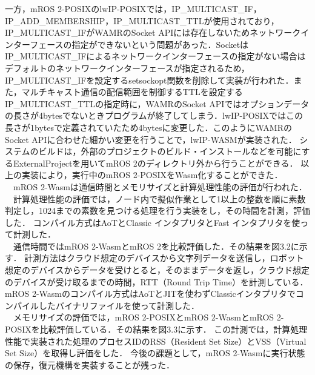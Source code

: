 一方，mROS 2-POSIXのlwIP-POSIXでは，IP\_MULTICAST\_IF，IP\_ADD\_MEMBERSHIP，IP\_MULTICAST\_TTLが使用されており，IP\_MULTICAST\_IFがWAMRのSocket APIには存在しないためネットワークインターフェースの指定ができないという問題があった．SocketはIP\_MULTICAST\_IFによるネットワークインターフェースの指定がない場合はデフォルトのネットワークインターフェースが指定されるため，IP\_MULTICAST\_IFを設定するsetsockopt関数を削除して実装が行われた．また，マルチキャスト通信の配信範囲を制御するTTLを設定するIP\_MULTICAST\_TTLの指定時に，WAMRのSocket APIではオプションデータの長さが4bytesでないときプログラムが終了してしまう．lwIP-POSIXではこの長さが1bytesで定義されていたため4bytesに変更した．このようにWAMRのSocket APIに合わせた細かい変更を行うことで，lwIP-WASMが実装された．
システムのビルドは，外部のプロジェクトのビルド・インストールなどを可能にするExternalProjectを用いてmROS 2のディレクトリ外から行うことができる．
以上の実装により，実行中のmROS 2-POSIXをWasm化することができた．
\\　mROS 2-Wasmは通信時間とメモリサイズと計算処理性能の評価が行われた．
\\　計算処理性能の評価では，ノード内で擬似作業として1以上の整数を順に素数判定し，1024までの素数を見つける処理を行う実装をし，その時間を計測，評価した．
コンパイル方式はAoTとClassic インタプリタとFast インタプリタを使って計測した．
\\　通信時間ではmROS 2-WasmとmROS 2を比較評価した．その結果を図3.2に示す．
計測方法はクラウド想定のデバイスから文字列データを送信し，ロボット想定のデバイスからデータを受けとると，そのままデータを返し，クラウド想定のデバイスが受け取るまでの時間，RTT（Round Trip Time）を計測している．mROS 2-Wasmのコンパイル方式はAoTとJITを使わずClassicインタプリタでコンパイルしたバイナリファイルを使って計測した．
\\　メモリサイズの評価では，mROS 2-POSIXとmROS 2-WasmとmROS 2-POSIXを比較評価している．その結果を図3.3に示す．
この計測では，計算処理性能で実装された処理のプロセスIDのRSS（Resident Set Size）とVSS（Virtual Set Size）を取得し評価をした．
今後の課題として，mROS 2-Wasmに実行状態の保存，復元機構を実装することが残った．
